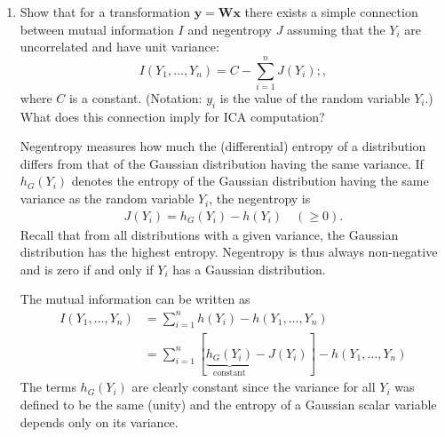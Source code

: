 \begin{enumerate}
\begin{solution}
  \end{solution}

  
\item Show that for a transformation $\mathbf{y} = \mathbf{W}
  \mathbf{x}$ there exists a simple connection between mutual information $I$
  and negentropy $J$ assuming that the $Y_i$ are uncorrelated and have
  unit variance:
  \[
  I(Y_1, \ldots , Y_n) = C - \sum_{i=1}^n J(Y_i) ; ,
  \]
  where $C$ is a constant. (Notation: $y_i$ is the value of the random
  variable $Y_i$.) What does this connection imply for ICA computation?

  \begin{solution}

    Negentropy measures how much the (differential) entropy of a distribution
    differs from that of the Gaussian distribution having the same
    variance.  If $h_G(Y_i)$ denotes the entropy of the Gaussian
    distribution having the same variance as the random variable $Y_i$,
    the negentropy is
    \begin{align*}
      J(Y_i) = h_G(Y_i) - h(Y_i) \quad (\geq 0).
    \end{align*}
    Recall that from all distributions with a given variance, the
    Gaussian distribution has the highest entropy.  Negentropy is thus
    always non-negative and is zero if and only if $Y_i$ has a
    Gaussian distribution.

    The mutual information can be written as
    \begin{align*}
      I(Y_1, \ldots, Y_n) &= \sum_{i=1}^n h(Y_i) - h(Y_1, \ldots, Y_n)
      \\
      &= \sum_{i=1}^n [\underbrace{h_G(Y_i)}_{\text{constant}} - J(Y_i)] - h(Y_1, \ldots, Y_n)
    \end{align*}
    The terms $h_G(Y_i)$ are clearly constant since the variance for
    all $Y_i$ was defined to be the same (unity) and the entropy of a
    Gaussian scalar variable depends only on its variance.


\end{solution}
\end{enumerate}
